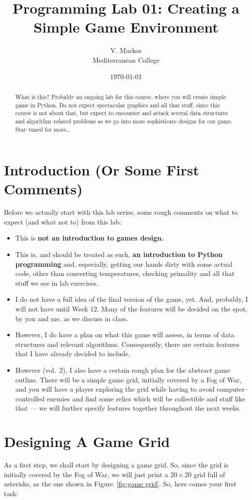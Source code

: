 \documentclass[a4paper, 11pt]{article}
\title{Programming Lab 01: Creating a Simple Game Environment}
\author{V. Markos\\Mediterranean College}
\date{\today}
\numberwithin{equation}{section}
\theoremstyle{definition}
\begin{document}
	\maketitle
	\begin{abstract}
		What is this? Probably an ongoing lab for this course, where you will create simple game in Python. Do not expect spectacular graphics and all that stuff, since this course is not about that, but expect to encounter and attack several data structures and algorithm--related problems as we go into more sophisticate designs for our game. Stay tuned for more\ldots
	\end{abstract}
	\section{Introduction (Or Some First Comments)}
	Before we actually start with this lab series, some rough comments on what to expect (and what not to) from this lab:
	\begin{itemize}
		\item This is \textbf{not an introduction to games design.}
		\item This is, and should be treated as such, \textbf{an introduction to Python programming} and, especially, getting our hands dirty with some actual code, other than converting temperatures, checking primality and all that stuff we see in lab exercises.
		\item I do not have a full idea of the final version of the game, yet. And, probably, I will not have until Week 12. Many of the features will be decided on the spot, by you and me, as we discuss in class.
		\item However, I do have a plan on what this game will assess, in terms of data structures and relevant algorithms. Consequently, there are certain features that I have already decided to include.
		\item However (vol.~2), I also have a certain rough plan for the abstract game outline. There will be a simple game grid, initially covered by a Fog of War, and you will have a player exploring the grid while having to avoid computer--controlled enemies and find some relics which will be collectible and stuff like that --- we will further specify features together throughout the next weeks.
	\end{itemize}
	\section{Designing A Game Grid}
	As a first step, we shall start by designing a game grid. So, since the grid is initially covered by the Fog of War, we will just print a $20\times 20$ grid full of asterisks, as the one shown in Figure~\ref{fig:game grid}. So, here comes your first task:
	
\end{document}
